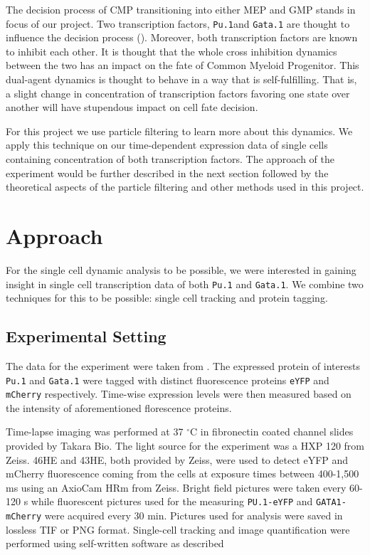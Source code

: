 \documentclass{bioinfo}
\begin{document}
The decision process of CMP transitioning into either MEP and GMP stands in focus of our project. Two transcription factors, \texttt{Pu.1}and \texttt{Gata.1} are thought to influence the decision process (\citealp{Graf09}). Moreover, both transcription factors are known to inhibit each other. It is thought that the whole cross inhibition dynamics between the two has an impact on the fate of Common Myeloid Progenitor. This dual-agent dynamics is thought to behave in a way that is self-fulfilling. That is, a slight change in concentration of transcription factors favoring one state over another will have stupendous impact on cell fate decision.

For this project we use particle filtering to learn more about this dynamics. We apply this technique on our time-dependent expression data of single cells containing concentration of both transcription factors. The approach of the experiment would be further described in the next section followed by the theoretical aspects of the particle filtering and other methods used in this project.

\section{Approach}

For the single cell dynamic analysis to be possible, we were interested in gaining insight in single cell transcription data of both \texttt{Pu.1} and \texttt{Gata.1}. We combine two techniques for this to be possible: single cell tracking and protein tagging.

\subsection{Experimental Setting}

The data for the experiment were taken from \citealp{Hoppe16}. The expressed protein of interests \texttt{Pu.1} and \texttt{Gata.1} were tagged with distinct fluorescence proteins \texttt{eYFP} and \texttt{mCherry} respectively. Time-wise expression levels were then measured based on the intensity of aforementioned florescence proteins.

Time-lapse imaging was performed at 37 $^{\circ}$C in fibronectin coated channel slides provided by Takara Bio. The light source for the experiment was a HXP 120 from Zeiss. 46HE and 43HE, both provided by Zeiss, were used to detect eYFP and mCherry fluorescence coming from the cells at exposure times between 400-1,500 ms using an AxioCam HRm from Zeiss. Bright field pictures were taken every 60-120 s while fluorescent pictures used for the measuring \texttt{PU.1-eYFP} and \texttt{GATA1-mCherry} were acquired every 30 min. Pictures used for analysis were saved in lossless TIF or PNG format. Single-cell tracking and image quantification were performed using self-written software as described
\end{document}
